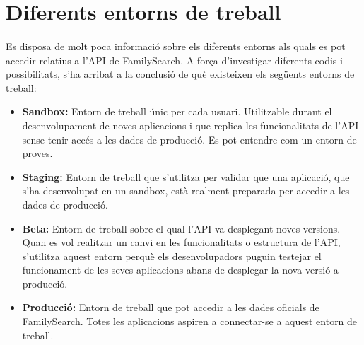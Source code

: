 \section{Diferents entorns de treball}

    \paragraph{}
    Es disposa de molt poca informació sobre els diferents entorns als quals es pot accedir relatius a l'API de FamilySearch. A força d'investigar diferents codis i possibilitats, s'ha arribat a la conclusió de què existeixen els següents entorns de treball:

    \begin{itemize}
        \item \textbf{Sandbox:} Entorn de treball únic per cada usuari. Utilitzable durant el desenvolupament de noves aplicacions i que replica les funcionalitats de l'API sense tenir accés a les dades de producció. Es pot entendre com un entorn de proves.
        \item \textbf{Staging:} Entorn de treball que s'utilitza per validar que una aplicació, que s'ha desenvolupat en un sandbox, està realment preparada per accedir a les dades de producció.
        \item \textbf{Beta:} Entorn de treball sobre el qual l'API va desplegant noves versions. Quan es vol realitzar un canvi en les funcionalitats o estructura de l'API, s'utilitza aquest entorn perquè els desenvolupadors puguin testejar el funcionament de les seves aplicacions abans de desplegar la nova versió a producció.
        \item \textbf{Producció:} Entorn de treball que pot accedir a les dades oficials de FamilySearch. Totes les aplicacions aspiren a connectar-se a aquest entorn de treball.
    \end{itemize}
